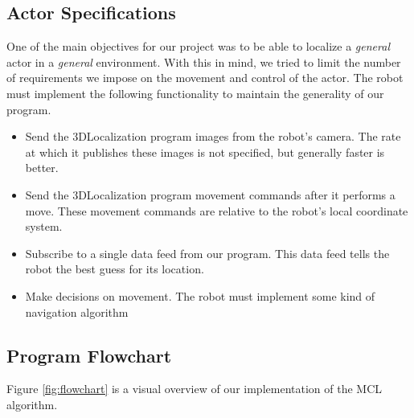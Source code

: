 \documentclass[a4paper,11pt]{article}
\begin{document}
\subsection{Actor Specifications}
One of the main objectives for our project was to be able to localize a \emph{general} actor in a \emph{general} environment. With this in mind, we tried to limit the number of requirements we impose on the movement and control of the actor. 
The robot must implement the following functionality to maintain the generality of our program.
  \begin{itemize}
  \item Send the 3DLocalization program images from the robot's camera. The rate at which it publishes these images is not specified, but generally faster is better. 
  \item Send the 3DLocalization program movement commands after it performs a move. These movement commands are relative to the robot's local coordinate system.
  \item Subscribe to a single data feed from our program. This data feed tells the robot the best guess for its location.
  \item Make decisions on movement. The robot must implement some kind of navigation algorithm
\end{itemize} 


 \subsection{Program Flowchart}
  Figure \ref{fig:flowchart} is a visual overview of our implementation of the MCL algorithm.
  
\end{document}
